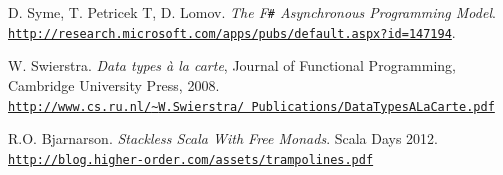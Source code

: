 \documentclass[9pt,a4paper]{article}
\newcommand{\fsharp}{F\texttt \#}
\newcommand{\samehref}[1]{\href{#1}{\texttt{#1}}}
\begin{document}
\begin{thebibliography}{9}
     D. Syme, T. Petricek T, D. Lomov.
        \emph{The \fsharp{} Asynchronous Programming Model}. \\ 
        \samehref{http://research.microsoft.com/apps/pubs/default.aspx?id=147194}.
        
        W. Swierstra. \emph{Data types \`{a} la carte}, Journal of Functional Programming, \\ 	   
        Cambridge University Press, 2008. \\
        \href{http://www.cs.ru.nl/~W.Swierstra/Publications/DataTypesALaCarte.pdf}
            {\texttt{http://www.cs.ru.nl/{\textasciitilde}W.Swierstra/%
                        Publications/DataTypesALaCarte.pdf}}
        
        R.O. Bjarnarson. \emph{Stackless Scala With Free Monads}. Scala Days 2012.\\
        \samehref{http://blog.higher-order.com/assets/trampolines.pdf}

\end{thebibliography}
\end{document}
